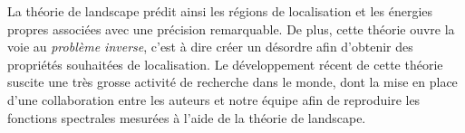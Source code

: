 La théorie de landscape prédit ainsi les régions de localisation et les énergies propres associées avec une précision remarquable. De plus, cette théorie ouvre la voie au \emph{problème inverse}, c'est à dire créer un désordre afin d'obtenir des propriétés souhaitées de localisation. Le développement récent de cette théorie suscite une très grosse activité de recherche dans le monde, dont la mise en place d'une collaboration entre les auteurs et notre équipe afin de reproduire les fonctions spectrales mesurées à l'aide de la théorie de landscape.

